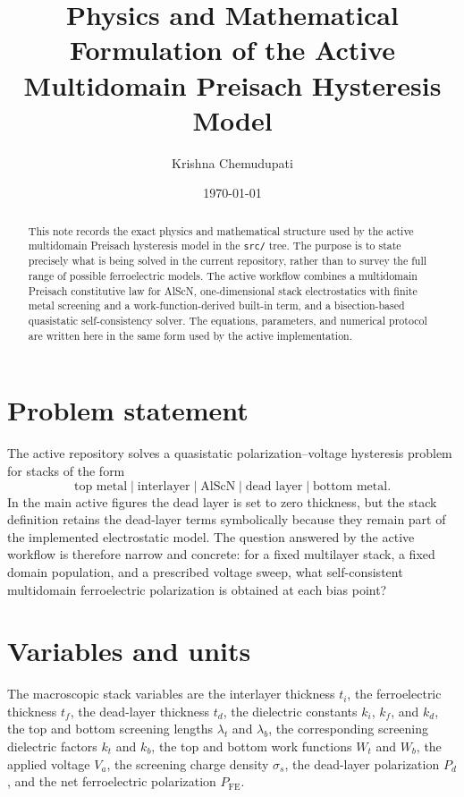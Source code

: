 \documentclass[11pt]{article}
\title{Physics and Mathematical Formulation of the Active Multidomain Preisach Hysteresis Model}
\author{Krishna Chemudupati}
\date{\today}
\begin{document}
\maketitle

\begin{abstract}
This note records the exact physics and mathematical structure used by the
active multidomain Preisach hysteresis model in the \texttt{src/} tree. The
purpose is to state precisely what is being solved in the current repository,
rather than to survey the full range of possible ferroelectric models. The
active workflow combines a multidomain Preisach constitutive law for AlScN,
one-dimensional stack electrostatics with finite metal screening and a
work-function-derived built-in term, and a bisection-based quasistatic
self-consistency solver. The equations, parameters, and numerical protocol are
written here in the same form used by the active implementation.
\end{abstract}

\tableofcontents
\clearpage

\section{Problem statement}

The active repository solves a quasistatic polarization--voltage hysteresis
problem for stacks of the form
\[
\text{top metal}
\;|\;
\text{interlayer}
\;|\;
\text{AlScN}
\;|\;
\text{dead layer}
\;|\;
\text{bottom metal}.
\]
In the main active figures the dead layer is set to zero thickness, but the
stack definition retains the dead-layer terms symbolically because they remain
part of the implemented electrostatic model. The question answered by the
active workflow is therefore narrow and concrete: for a fixed multilayer stack,
a fixed domain population, and a prescribed voltage sweep, what self-consistent
multidomain ferroelectric polarization is obtained at each bias point?

\section{Variables and units}

The macroscopic stack variables are the interlayer thickness $t_i$, the
ferroelectric thickness $t_f$, the dead-layer thickness $t_d$, the dielectric
constants $k_i$, $k_f$, and $k_d$, the top and bottom screening lengths
$\lambda_t$ and $\lambda_b$, the corresponding screening dielectric factors
$k_t$ and $k_b$, the top and bottom work functions $W_t$ and $W_b$, the
applied voltage $V_a$, the screening charge density $\sigma_s$, the dead-layer
polarization $P_d$, and the net ferroelectric polarization
$P_{\mathrm{FE}}$.
\end{document}
